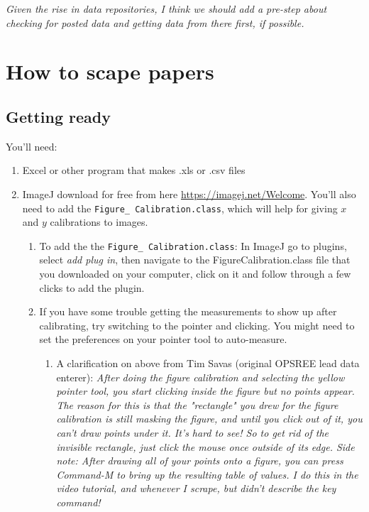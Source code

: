 \documentclass{article}[12pt]
\begin{document}
\emph{Given the rise in data repositories, I think we should add a pre-step about checking for posted data and getting data from there first, if possible.}

\section*{How to scape papers}
\subsection*{Getting ready}
You'll need:
\begin{enumerate}
\item Excel or other program that makes .xls  or .csv files
\item ImageJ download for free from here \url{https://imagej.net/Welcome}. You'll also need to add the \verb|Figure_ Calibration.class|, which will help for giving $x$ and $y$ calibrations to images. 
\begin{enumerate}
\item To add the the  \verb|Figure_ Calibration.class|: In ImageJ go to plugins, select \textit{add plug in}, then navigate to the Figure\textunderscore Calibration.class file that you downloaded on your computer, click on it and follow through a few clicks to add the plugin.
\item If you have some trouble getting the measurements to show up after calibrating, try switching to the pointer and clicking. You might need to set the preferences on your pointer tool to auto-measure.
\begin{enumerate}
\item A clarification on above from Tim Savas (original OPSREE lead data enterer): \textit{After doing the figure calibration and selecting the yellow pointer tool, you start clicking inside the figure but no points appear. The reason for this is that the "rectangle" you drew for the figure calibration is still masking the figure, and until you click out of it, you can't draw points under it. It's hard to see! So to get rid of the invisible rectangle, just click the mouse once outside of its edge. Side note: After drawing all of your points onto a figure, you can press Command-M to bring up the resulting table of values. I do this in the video tutorial, and whenever I scrape, but didn't describe the key command!}
\end{enumerate}
\end{enumerate}
\end{enumerate}
\end{document}
